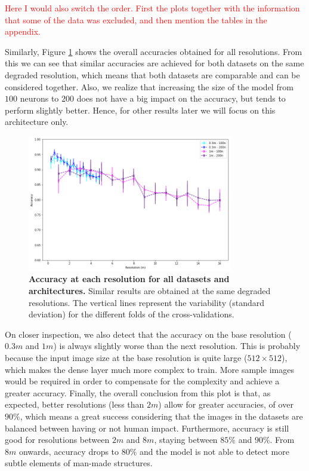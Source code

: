 \textcolor{red}{Here I would also switch the order. First the plots together with the information that some of the data was excluded, and then mention the tables in the appendix.}

Similarly, Figure \ref{fig:acc_res_03m_1m} shows the overall accuracies obtained for all resolutions. From this we can see that similar accuracies are achieved for both datasets on the same degraded resolution, which means that both datasets are comparable and can be considered together. Also, we realize that increasing the size of the model from $100$ neurons to $200$ does not have a big impact on the accuracy, but tends to perform slightly better. Hence, for other results later we will focus on this architecture only.

\begin{figure}[h!]
	\centering
	\includegraphics[width=0.8\textwidth]{Figures/results/acc_res_03m_1m.png}
	\captionsetup{width=1\linewidth}
	\caption{\textbf{Accuracy at each resolution for all datasets and architectures.} Similar results are obtained at the same degraded resolutions. The vertical lines represent the variability (standard deviation) for the different folds of the cross-validations.}
	\label{fig:acc_res_03m_1m}
\end{figure}

On closer inspection, we also detect that the accuracy on the base resolution ($0.3m$ and $1m$) is always slightly worse than the next resolution. This is probably because the input image size at the base resolution is quite large ($512\times512$), which makes the dense layer much more complex to train. More sample images would be required in order to compensate for the complexity and achieve a greater accuracy. Finally, the overall conclusion from this plot is that, as expected, better resolutions (less than $2m$) allow for greater accuracies, of over $90\%$, which means a great success considering that the images in the datasets are balanced between having or not human impact. Furthermore, accuracy is still good for resolutions between $2m$ and $8m$, staying between $85\%$ and $90\%$. From $8m$ onwards, accuracy drops to $80\%$ and the model is not able to detect more subtle elements of man-made structures.

